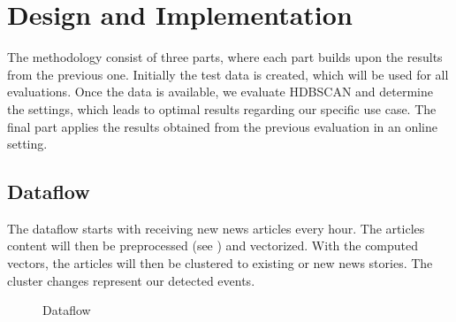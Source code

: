 \section{Design and Implementation}
\label{sec:4_design_and_implementation}

The methodology consist of three parts, where each part builds upon the results from the previous one.
Initially the test data is created, which will be used for all evaluations.
Once the data is available, we evaluate HDBSCAN and determine the settings,
which leads to optimal results regarding our specific use case.
The final part applies the results obtained from the previous evaluation in an online setting.

\subsection{Dataflow}
\label{subsec:4_dataflow}

The dataflow starts with receiving new news articles every hour.
The articles content will then be preprocessed (see )
and vectorized.
With the computed vectors, the articles will then be clustered to existing or new news stories.
The cluster changes represent our detected events.

\begin{figure}[!htb]
    \centering

    \caption{Dataflow}
    \label{fig:dataflow}
\end{figure}




